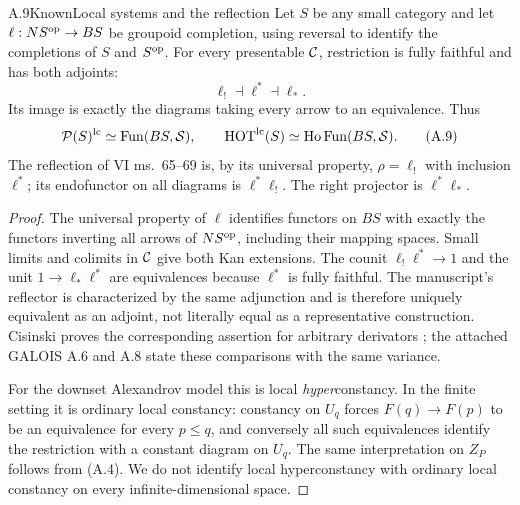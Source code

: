 \begin{statement}{A.9}{Known}{Local systems and the reflection}
Let $S$ be any small category and let
$\ell:NS^{\mathrm{op}}\to BS$ be groupoid completion, using reversal to
identify the completions of $S$ and $S^{\mathrm{op}}$. For every presentable
$\mathcal C$, restriction is fully faithful and has both adjoints:
\[
 \ell_!\dashv \ell^*\dashv\ell_*.
\]
Its image is exactly the diagrams taking every arrow to an equivalence.
Thus
\[
 \mathcal P(S)^{\mathrm{lc}}\simeq\operatorname{Fun}(BS,\mathcal S),\qquad
 \mathrm{HOT}^{\mathrm{lc}}(S)\simeq\operatorname{Ho}\operatorname{Fun}(BS,\mathcal S).
\tag{A.9}
\]
The reflection of VI ms.~65--69 is, by its universal property,
$\rho=\ell_!$ with inclusion $\ell^*$; its endofunctor on all diagrams
is $\ell^*\ell_!$. The right projector is $\ell^*\ell_*$.
\end{statement}
\begin{proof}
The universal property of $\ell$ identifies functors on $BS$ with exactly
the functors inverting all arrows of $NS^{\mathrm{op}}$, including their mapping
spaces. Small limits and colimits in $\mathcal C$ give both Kan extensions.
The counit $\ell_!\ell^*\to1$ and the unit $1\to\ell_*\ell^*$ are
equivalences because $\ell^*$ is fully faithful. The manuscript's
reflector is characterized by the same adjunction and is therefore
uniquely equivalent as an adjoint, not literally equal as a representative
construction. Cisinski proves the corresponding assertion for arbitrary
derivators \citep[Theorem 3.13]{Cisinski2009}; the attached GALOIS A.6 and
A.8 state these comparisons with the same variance.

For the downset Alexandrov model this is local \emph{hyper}constancy.
In the finite setting it is ordinary local constancy: constancy on
$U_q$ forces $F(q)\to F(p)$ to be an equivalence for every $p\leq q$,
and conversely all such equivalences identify the restriction with a
constant diagram on $U_q$. The same interpretation on $Z_P$ follows
from (A.4). We do not identify local hyperconstancy with ordinary local
constancy on every infinite-dimensional space.
\end{proof}

